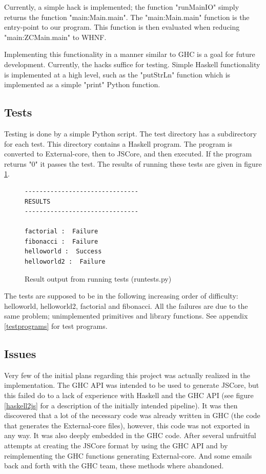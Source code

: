 Currently, a simple hack is implemented; the function "runMainIO" simply returns 
the function "main:Main.main".
The "main:Main.main" function is the entry-point to our program. This function 
is then evaluated when reducing "main:ZCMain.main" to WHNF.

Implementing this functionality in a manner similar to GHC is a goal for future
development. Currently, the hacks suffice for testing.
Simple Haskell functionality is implemented at a high level, such as the
"putStrLn" function which is implemented as a simple "print" Python function.

\subsection{Tests}

Testing is done by a simple Python script. The test directory has a subdirectory 
for each test. This directory
contains a Haskell program. The program is converted to External-core, then 
to JSCore, and then executed.
If the program returns "0" it passes the test. The results of running these 
tests are given in figure \ref{tests}.


\begin{figure}[H]
\begin{center}
\begin{minipage}{0.45\textwidth}
\begin{lstlisting}
-------------------------------
RESULTS
-------------------------------

factorial :  Failure
fibonacci :  Failure
helloworld :  Success
helloworld2 :  Failure
\end{lstlisting}
\end{minipage}
\end{center}
\caption[Result output from running tests]{Result output from running tests (runtests.py)}
\label{tests}
\end{figure}

The tests are supposed to be in the following increasing order of difficulty: 
helloworld, helloworld2, factorial and fibonacci. 
All the failures are due to the same problem; unimplemented 
primitives and library functions. See appendix \ref{testprograms} for test programs.

\subsection{Issues}


Very few of the initial plans regarding this project was actually realized in 
the implementation. The GHC API was intended to be used to generate JSCore, 
but this failed do to a lack of experience with Haskell and the GHC API 
(see figure \ref{haskell2js} for a description of the initially intended
pipeline). It was then discovered that a lot of the necessary code was already
written in GHC (the code that generates the External-core files), however, 
this code was not exported in any way. It was also deeply embedded in the GHC 
code. After several unfruitful attempts at creating the JSCore format by using the GHC API
and by reimplementing the GHC functions generating External-core. And some emails back 
and forth with the GHC team, these methods where abandoned.


